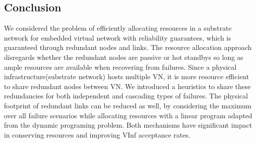 \subsection{Conclusion}
We considered the problem of efficiently allocating resources in a substrate network for embedded virtual network with reliability guarantees, which is
guaranteed through redundant nodes and links. The resource allocation approach disregards whether the redundant nodes are passive or hot standbys so long as ample resources are available when recovering from failures. Since a physical infrastructure(substrate network) hosts multiple VN, it is
more resource efficient to share redundant nodes between VN. We introduced a heuristics to share these redundancies for both independent and cascading types
of failures. The physical footprint of redundant links can be reduced as well, by considering the maximum over all failure scenarios while allocating resources with a linear program adapted from the dynamic programing problem. Both mechanisms have significant impact in conserving resources and improving VInf acceptance rates.
